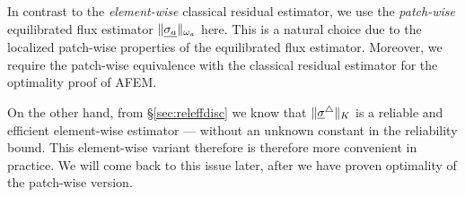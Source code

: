 \documentclass[thesis.tex]{subfiles}
\begin{document}
\begin{rem}
  In contrast to the \emph{element-wise} classical residual estimator, we use the \emph{patch-wise} equilibrated flux estimator $\| \underline{\sigma_a} \|_{\omega_a}$ here. This
  is a natural choice due to the localized patch-wise properties of the equilibrated flux estimator. 
  Moreover, we require the patch-wise equivalence with the classical residual estimator for the optimality proof of AFEM.

  On the other hand, from \S\ref{sec:releffdisc} we know that $\| \underline{\sigma}^\triangle \|_K$ is a reliable and efficient
  element-wise estimator --- without an unknown constant in the reliability bound. This element-wise variant
  therefore is therefore more convenient in practice. We will come back to this issue later, after we have proven
  optimality of the patch-wise version.
\end{rem}
\end{document}
